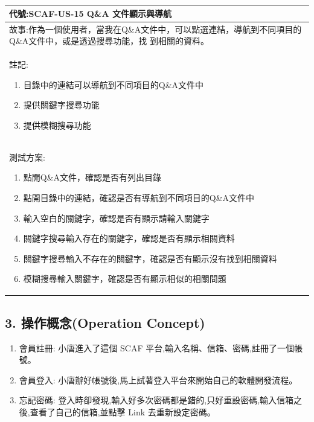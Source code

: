 \documentclass{report}
\begin{document}
\subsection*{}
\fontsize{12}{20}\selectfont
\begin{tabularx}{\textwidth}{|X|}
  \hline
  代號:SCAF-US-15 Q\&A 文件顯示與導航 \\
  \hline
  故事:作為一個使用者，當我在Q\&A文件中，可以點選連結，導航到不同項目的Q\&A文件中，或是透過搜尋功能，找
  到相關的資料。 \\
  \hline
  註記:
  \begin{enumerate}
    \item 目錄中的連結可以導航到不同項目的Q\&A文件中
    \item 提供關鍵字搜尋功能
    \item 提供模糊搜尋功能
  \end{enumerate} \\
  \hline
  測試方案:
  \begin{enumerate}
    \item 點開Q\&A文件，確認是否有列出目錄
    \item 點開目錄中的連結，確認是否有導航到不同項目的Q\&A文件中
    \item 輸入空白的關鍵字，確認是否有顯示請輸入關鍵字
    \item 關鍵字搜尋輸入存在的關鍵字，確認是否有顯示相關資料
    \item 關鍵字搜尋輸入不存在的關鍵字，確認是否有顯示沒有找到相關資料
    \item 模糊搜尋輸入關鍵字，確認是否有顯示相似的相關問題
  \end{enumerate} \\
  \hline
\end{tabularx}


\subsection*{3. 操作概念(Operation
 Concept)}

\begin{enumerate}[label=(\Alph*)]
  \item 會員註冊: 小唐進入了這個 SCAF 平台,輸入名稱、信箱、密碼,註冊了一個帳號。
  \item 會員登入: 小唐辦好帳號後,馬上試著登入平台來開始自己的軟體開發流程。
  \item 忘記密碼: 登入時卻發現,輸入好多次密碼都是錯的,只好重設密碼,輸入信箱之後,查看了自己的信箱,並點擊 Link 去重新設定密碼。
\end{enumerate}
\end{document}
